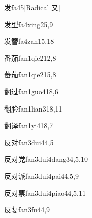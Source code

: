 \begin{entry}{发}{fa4}{5}[Radical ⼜]
\end{entry}

\begin{entry}{发型}{fa4xing2}{5,9}
\end{entry}

\begin{entry}{发簪}{fa4zan1}{5,18}
\end{entry}

\begin{entry}{番茄}{fan1qie2}{12,8}
\end{entry}

\begin{entry}{蕃茄}{fan1qie2}{15,8}
\end{entry}

\begin{entry}{翻过}{fan1guo4}{18,6}
\end{entry}

\begin{entry}{翻脸}{fan1lian3}{18,11}
\end{entry}

\begin{entry}{翻译}{fan1yi4}{18,7}
\end{entry}

\begin{entry}{反对}{fan3dui4}{4,5}
\end{entry}

\begin{entry}{反对党}{fan3dui4dang3}{4,5,10}
\end{entry}

\begin{entry}{反对派}{fan3dui4pai4}{4,5,9}
\end{entry}

\begin{entry}{反对票}{fan3dui4piao4}{4,5,11}
\end{entry}

\begin{entry}{反复}{fan3fu4}{4,9}
\end{entry}

